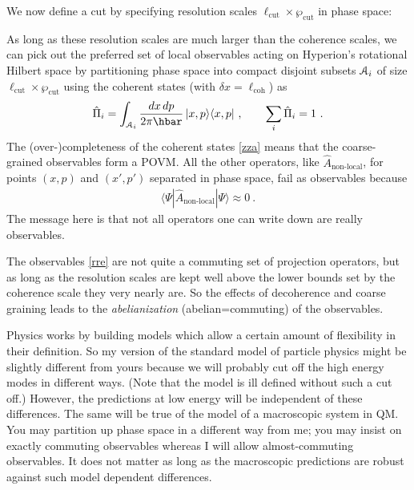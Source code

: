 \documentclass[12pt]{article}
\theoremstyle{plain}
\theoremstyle{definition}
\theoremstyle{remark}
\def\bra#1{\langle #1|}
\def\ket#1{| #1\rangle}
\newcommand{\EQ}[1]{\begin{equation}\begin{split} #1
\end{split}\end{equation}}
\begin{document}
We now define a cut by specifying resolution scales $\ell_\text{cut}\times\wp_\text{cut}$ in phase space: 
\begin{center}
\end{center}
As long as these resolution scales are much larger than the coherence scales, we can pick out the preferred set of local observables acting on Hyperion's rotational Hilbert space by partitioning phase space into compact disjoint subsets ${\EuScript A}_i$ of size $\ell_\text{cut}\times\wp_\text{cut}$ using the coherent states (with $\delta x=\ell_\text{coh}$) as
\EQ{
\hat\Pi_i=\int_{{\EuScript A}_i}\frac{dx\,dp}{2\pi\hbar}\,\ket{x,p}\bra{x,p}\ ,\qquad\sum_i\hat\Pi_i=1\ .
\label{rre}
}
The (over-)completeness of the coherent states \eqref{zza} means that the coarse-grained observables form a POVM.
All the other operators, like $\hat A_\text{non-local}$, for points $(x,p)$ and $(x',p')$ separated in phase space, fail as observables because 
\EQ{
\bra{\Psi}\hat A_\text{non-local}\ket{\Psi}\approx0\ .
}
The message here is that not all operators one can write down are really observables.

The observables \eqref{rre} are not quite a commuting set of projection operators, but as long as the resolution scales are kept well above the lower bounds set by the coherence scale they very nearly are. So the effects of decoherence and coarse graining leads to the {\it abelianization\/} (abelian=commuting) of the observables. 

Physics works by building models which allow a certain amount of flexibility in their definition. So my version of the standard model of particle physics might be slightly different from yours because we will probably cut off the high energy modes in different ways. (Note that the model is ill defined without such a cut off.) However, the predictions at low energy will be independent of these differences. The same will be true of the model of a macroscopic system in QM. You may partition up phase space in a different way from me; you may insist on exactly commuting observables whereas I will allow almost-commuting observables. It does not matter as long as the macroscopic predictions are robust against such model dependent differences.
\end{document}
